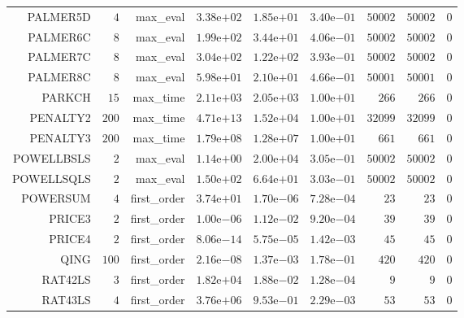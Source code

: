 \begin{longtable}{rrrrrrrrr}
PALMER5D & \(     4\) & max\_eval & \( 3.38\)e\(+02\) & \( 1.85\)e\(+01\) & \( 3.40\)e\(-01\) & \( 50002\) & \( 50002\) & \(     0\) \\
PALMER6C & \(     8\) & max\_eval & \( 1.99\)e\(+02\) & \( 3.44\)e\(+01\) & \( 4.06\)e\(-01\) & \( 50002\) & \( 50002\) & \(     0\) \\
PALMER7C & \(     8\) & max\_eval & \( 3.04\)e\(+02\) & \( 1.22\)e\(+02\) & \( 3.93\)e\(-01\) & \( 50002\) & \( 50002\) & \(     0\) \\
PALMER8C & \(     8\) & max\_eval & \( 5.98\)e\(+01\) & \( 2.10\)e\(+01\) & \( 4.66\)e\(-01\) & \( 50001\) & \( 50001\) & \(     0\) \\
PARKCH & \(    15\) & max\_time & \( 2.11\)e\(+03\) & \( 2.05\)e\(+03\) & \( 1.00\)e\(+01\) & \(   266\) & \(   266\) & \(     0\) \\
PENALTY2 & \(   200\) & max\_time & \( 4.71\)e\(+13\) & \( 1.52\)e\(+04\) & \( 1.00\)e\(+01\) & \( 32099\) & \( 32099\) & \(     0\) \\
PENALTY3 & \(   200\) & max\_time & \( 1.79\)e\(+08\) & \( 1.28\)e\(+07\) & \( 1.00\)e\(+01\) & \(   661\) & \(   661\) & \(     0\) \\
POWELLBSLS & \(     2\) & max\_eval & \( 1.14\)e\(+00\) & \( 2.00\)e\(+04\) & \( 3.05\)e\(-01\) & \( 50002\) & \( 50002\) & \(     0\) \\
POWELLSQLS & \(     2\) & max\_eval & \( 1.50\)e\(+02\) & \( 6.64\)e\(+01\) & \( 3.03\)e\(-01\) & \( 50002\) & \( 50002\) & \(     0\) \\
POWERSUM & \(     4\) & first\_order & \( 3.74\)e\(+01\) & \( 1.70\)e\(-06\) & \( 7.28\)e\(-04\) & \(    23\) & \(    23\) & \(     0\) \\
PRICE3 & \(     2\) & first\_order & \( 1.00\)e\(-06\) & \( 1.12\)e\(-02\) & \( 9.20\)e\(-04\) & \(    39\) & \(    39\) & \(     0\) \\
PRICE4 & \(     2\) & first\_order & \( 8.06\)e\(-14\) & \( 5.75\)e\(-05\) & \( 1.42\)e\(-03\) & \(    45\) & \(    45\) & \(     0\) \\
QING & \(   100\) & first\_order & \( 2.16\)e\(-08\) & \( 1.37\)e\(-03\) & \( 1.78\)e\(-01\) & \(   420\) & \(   420\) & \(     0\) \\
RAT42LS & \(     3\) & first\_order & \( 1.82\)e\(+04\) & \( 1.88\)e\(-02\) & \( 1.28\)e\(-04\) & \(     9\) & \(     9\) & \(     0\) \\
RAT43LS & \(     4\) & first\_order & \( 3.76\)e\(+06\) & \( 9.53\)e\(-01\) & \( 2.29\)e\(-03\) & \(    53\) & \(    53\) & \(     0\) \\

\end{longtable}
